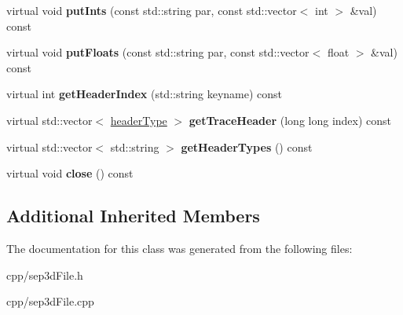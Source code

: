 \begin{DoxyCompactItemize}
virtual void {\bfseries put\+Ints} (const std\+::string par, const std\+::vector$<$ int $>$ \&val) const
\item 
\mbox{\label{class_s_e_p_1_1sep3d_file_ac705ae832f4d0d9412807a21cac04b49}} 
virtual void {\bfseries put\+Floats} (const std\+::string par, const std\+::vector$<$ float $>$ \&val) const
\item 
\mbox{\label{class_s_e_p_1_1sep3d_file_aff5669a7910470cacecb5b715a43baf1}} 
virtual int {\bfseries get\+Header\+Index} (std\+::string keyname) const
\item 
\mbox{\label{class_s_e_p_1_1sep3d_file_a72dcb74b84beb3b0ed2e584a5ea28624}} 
virtual std\+::vector$<$ \hyperlink{union_s_e_p_1_1header_type}{header\+Type} $>$ {\bfseries get\+Trace\+Header} (long long index) const
\item 
\mbox{\label{class_s_e_p_1_1sep3d_file_a20f0418752ea45501e6728988c13305d}} 
virtual std\+::vector$<$ std\+::string $>$ {\bfseries get\+Header\+Types} () const
\item 
\mbox{\label{class_s_e_p_1_1sep3d_file_aaf606b71bd0e41f0bf8f418f4c39072f}} 
virtual void {\bfseries close} () const
\end{DoxyCompactItemize}
\subsection*{Additional Inherited Members}


The documentation for this class was generated from the following files\+:\begin{DoxyCompactItemize}
\item 
cpp/sep3d\+File.\+h\item 
cpp/sep3d\+File.\+cpp\end{DoxyCompactItemize}
